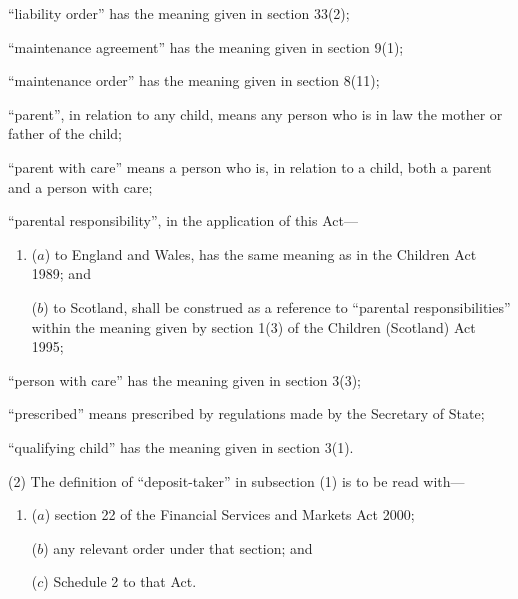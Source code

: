 \documentclass[12pt,a4paper]{article}
\begin{document}
\begin{enumerate}
“liability order” has the meaning given in section 33(2);

“maintenance agreement” has the meaning given in section 9(1);



“maintenance order” has the meaning given in section 8(11);


“parent”, in relation to any child, means any person who is in law the mother
or father of the child;

“parent with care” means a person who is, in relation to a child, both a parent and
a person with care;

“parental responsibility”, in the application of this Act---
\begin{enumerate}\item[]
($a$) to England and Wales, has the same meaning as in the Children Act 1989; and

($b$) to Scotland, shall be construed as a reference to “parental responsibilities” within the meaning given by section 1(3) of the Children (Scotland) Act 1995;
\end{enumerate}


“person with care” has the meaning given in section 3(3);

“prescribed” means prescribed by regulations made by the Secretary of State;

“qualifying child” has the meaning given in section 3(1).
\end{enumerate}

(2) The definition of “deposit-taker” in subsection (1) is to be read with—
\begin{enumerate}\item[]
($a$) section 22 of the Financial Services and Markets Act 2000;

($b$) any relevant order under that section; and

($c$) Schedule 2 to that Act.
\end{enumerate}
\end{document}
